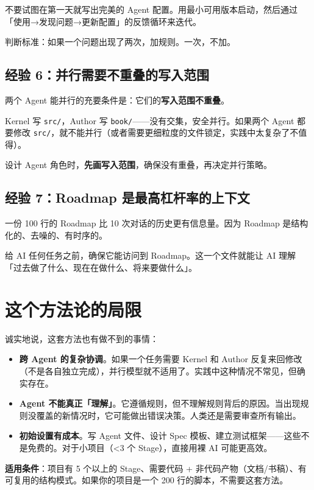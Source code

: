 不要试图在第一天就写出完美的 Agent 配置。用最小可用版本启动，然后通过「使用→发现问题→更新配置」的反馈循环来迭代。

判断标准：如果一个问题出现了两次，加规则。一次，不加。

\subsection{经验 6：并行需要不重叠的写入范围}

两个 Agent 能并行的充要条件是：它们的\textbf{写入范围不重叠}。

Kernel 写 \texttt{src/}，Author 写 \texttt{book/}——没有交集，安全并行。如果两个 Agent 都要修改 \texttt{src/}，就不能并行（或者需要更细粒度的文件锁定，实践中太复杂了不值得）。

设计 Agent 角色时，\textbf{先画写入范围}，确保没有重叠，再决定并行策略。

\subsection{经验 7：Roadmap 是最高杠杆率的上下文}

一份 100 行的 Roadmap 比 10 次对话的历史更有信息量。因为 Roadmap 是结构化的、去噪的、有时序的。

给 AI 任何任务之前，确保它能访问到 Roadmap。这一个文件就能让 AI 理解「过去做了什么、现在在做什么、将来要做什么」。

\section{这个方法论的局限}

诚实地说，这套方法也有做不到的事情：

\begin{itemize}
  \item \textbf{跨 Agent 的复杂协调}。如果一个任务需要 Kernel 和 Author 反复来回修改（不是各自独立完成），并行模型就不适用了。实践中这种情况不常见，但确实存在。
  \item \textbf{Agent 不能真正「理解」}。它遵循规则，但不理解规则背后的原因。当出现规则没覆盖的新情况时，它可能做出错误决策。人类还是需要审查所有输出。
  \item \textbf{初始设置有成本}。写 Agent 文件、设计 Spec 模板、建立测试框架——这些不是免费的。对于小项目（<3 个 Stage），直接用裸 AI 可能更高效。
\end{itemize}

\begin{designbox}
\textbf{适用条件}：项目有 5 个以上的 Stage、需要代码 + 非代码产物（文档/书稿）、有可复用的结构模式。如果你的项目是一个 200 行的脚本，不需要这套方法。
\end{designbox}

